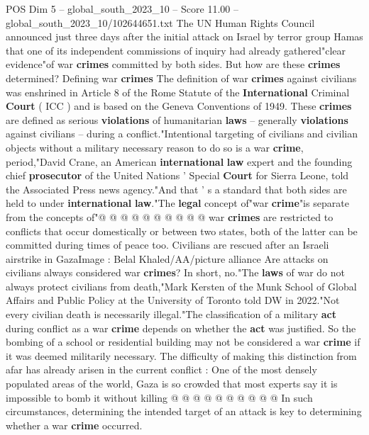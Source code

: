 \begin{textsample}{POS Dim 5 – global\_south\_2023\_10 – Score 11.00 – global\_south\_2023\_10/102644651.txt}  \label{ex:f5_pos_368}
The UN Human Rights Council announced just three days after the initial attack on Israel by terror group Hamas that one of its independent commissions of inquiry had already gathered"clear evidence"of war \textbf{crimes} committed by both sides.
But how are these \textbf{crimes} determined?
Defining war \textbf{crimes} The definition of war \textbf{crimes} against civilians was enshrined in Article 8 of the Rome Statute of the \textbf{International} Criminal \textbf{Court} ( ICC ) and is based on the Geneva Conventions of 1949.
These \textbf{crimes} are defined as serious \textbf{violations} of humanitarian \textbf{laws} -- generally \textbf{violations} against civilians -- during a conflict."Intentional targeting of civilians and civilian objects without a military necessary reason to do so is a war \textbf{crime}, period,"David Crane, an American \textbf{international} \textbf{law} expert and the founding chief \textbf{prosecutor} of the United Nations ' Special \textbf{Court} for Sierra Leone, told the Associated Press news agency."And that ' s a standard that both sides are held to under \textbf{international} \textbf{law}."The \textbf{legal} concept of"war \textbf{crime}"is separate from the concepts of"@ @ @ @ @ @ @ @ @ @ war \textbf{crimes} are restricted to conflicts that occur domestically or between two states, both of the latter can be committed during times of peace too.
Civilians are rescued after an Israeli airstrike in GazaImage : Belal Khaled/AA/picture alliance Are attacks on civilians always considered war \textbf{crimes}?
In short, no."The \textbf{laws} of war do not always protect civilians from death,"Mark Kersten of the Munk School of Global Affairs and Public Policy at the University of Toronto told DW in 2022."Not every civilian death is necessarily illegal."The classification of a military \textbf{act} during conflict as a war \textbf{crime} depends on whether the \textbf{act} was justified.
So the bombing of a school or residential building may not be considered a war \textbf{crime} if it was deemed militarily necessary.
The difficulty of making this distinction from afar has already arisen in the current conflict : One of the most densely populated areas of the world, Gaza is so crowded that most experts say it is impossible to bomb it without killing @ @ @ @ @ @ @ @ @ @ In such circumstances, determining the intended target of an attack is key to determining whether a war \textbf{crime} occurred.

\end{textsample}
